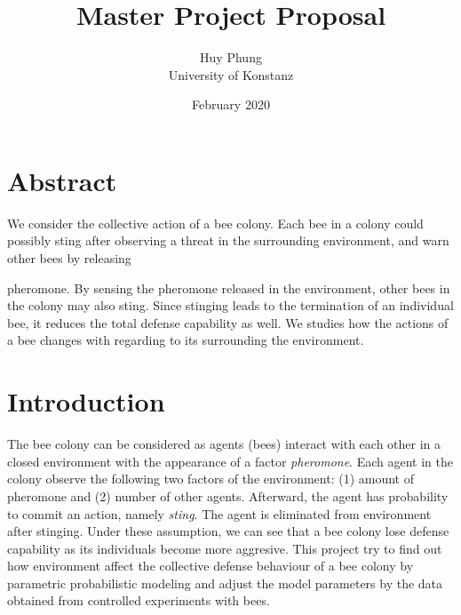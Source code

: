 \documentclass[notitlepage]{report}
\title{Master Project Proposal}
\author{Huy Phung\\University of Konstanz}
\date{February 2020}
\begin{document}
\maketitle

\section*{Abstract}
  We consider the collective action of a bee colony. Each bee in a colony could
  possibly sting after observing a threat in the surrounding
  environment, and warn other bees by releasing {pheromone. By sensing
  the pheromone released in the environment, other bees in the colony may also
  sting. Since stinging leads to the termination of an individual bee, it
  reduces the total defense capability as well. We studies how the actions of a
  bee changes with regarding to its surrounding the environment.

\section*{Introduction}
The bee colony can be considered as agents (bees) interact with each other in a
closed environment with the appearance of a factor \textit{pheromone}. Each
agent in the colony observe the following two factors of the environment: (1)
amount of pheromone and (2) number of other agents. Afterward, the agent has
probability to commit an action, namely \textit{sting}. The agent is eliminated
from environment after stinging. Under these assumption, we can see that a bee
colony lose defense capability as its individuals become more aggresive. This
project try to find out how environment affect the collective defense behaviour
of a bee colony by parametric probabilistic modeling and adjust the model
parameters by the data obtained from controlled experiments with bees.

}
\end{document}
